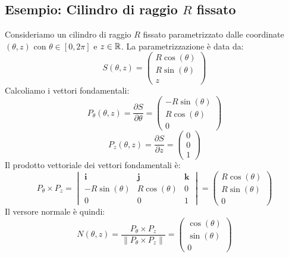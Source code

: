 \subsection{Esempio: Cilindro di raggio $R$ fissato}
  Consideriamo un cilindro di raggio $R$ fissato parametrizzato dalle coordinate $(\theta, z)$ con $\theta \in [0, 2\pi]$ e $z \in \mathbb{R}$. La parametrizzazione è data da:
  \[
  S(\theta, z) = \begin{pmatrix}
    R \cos(\theta) \\
    R \sin(\theta) \\
    z
  \end{pmatrix}
  \]
  Calcoliamo i vettori fondamentali:
  \[
  P_\theta(\theta, z) = \frac{\partial S}{\partial \theta} = \begin{pmatrix}
    -R \sin(\theta) \\
    R \cos(\theta) \\
    0
  \end{pmatrix}
  \]
  \[
  P_z(\theta, z) = \frac{\partial S}{\partial z} = \begin{pmatrix}
    0 \\
    0 \\
    1
  \end{pmatrix}
  \]
  Il prodotto vettoriale dei vettori fondamentali è:
  \[
  P_\theta \times P_z = \begin{vmatrix}
    \mathbf{i} & \mathbf{j} & \mathbf{k} \\
    -R \sin(\theta) & R \cos(\theta) & 0 \\
    0 & 0 & 1
  \end{vmatrix}
  = \begin{pmatrix}
    R \cos(\theta) \\
    R \sin(\theta) \\
    0
  \end{pmatrix}
  \]
  Il versore normale è quindi:
  \[
  N(\theta, z) = \frac{P_\theta \times P_z}{\|P_\theta \times P_z\|} = \begin{pmatrix}
    \cos(\theta) \\
    \sin(\theta) \\
    0
  \end{pmatrix}
  \]

